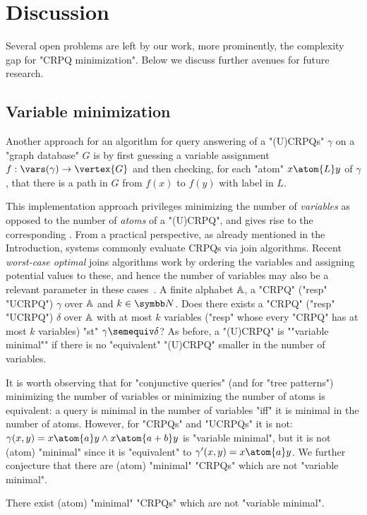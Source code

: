 \section{Discussion}
\AP\label{sec:discussion}

Several open problems are left by our work, more prominently, the complexity gap for "CRPQ minimization". Below we discuss further avenues for future research.

\subsection{Variable minimization}
\AP\label{sec:varmin}

Another approach for an algorithm for query answering of a "(U)CRPQs" $\gamma$ on a "graph database" $G$ is by first guessing a variable assignment $f: \vars(\gamma) \to \vertex{G}$ and then checking, for each "atom" $x \atom{L} y$ of $\gamma$, that there is a path in $G$ from $f(x)$ to $f(y)$ with label in $L$. 

This implementation approach privileges minimizing the number of \emph{variables} as opposed to the number of \emph{atoms} of a "(U)CRPQ", and gives rise to the corresponding . From a practical perspective, as already mentioned in the Introduction, systems commonly evaluate CRPQs via join algorithms. Recent \emph{worst-case optimal} joins algorithms work by ordering the variables and assigning potential values to these, and hence the number of variables may also be a relevant parameter in these cases~\cite{CucumidesReutterVrgoc2024SizeBounds,VrgocEtal2024MillenniumDB}. 
{A finite alphabet $\mathbb{A}$, a  "CRPQ" ("resp" "UCRPQ") $\gamma$ over $\mathbb{A}$ and $k \in \N$.}
{Does there exists a "CRPQ" ("resp" "UCRPQ") $\delta$ over $\mathbb{A}$ with at most $k$ variables 
("resp" whose every "CRPQ" has at most $k$ variables) "st" $\gamma \semequiv \delta$?}
As before, a "(U)CRPQ" is \AP""variable minimal"" if there is no "equivalent" "(U)CRPQ" smaller in the number of variables.

It is worth observing that for "conjunctive queries" (and for "tree patterns") minimizing the number of variables or minimizing the number of atoms is equivalent: a query is minimal in the number of variables "iff" it is minimal in the number of atoms.
However, for "CRPQs" and "UCRPQs" it is not: $\gamma(x,y) = x \atom{a} y \land x \atom{a+b} y$ is "variable minimal", but it is not (atom) "minimal" since it is "equivalent" to $\gamma'(x,y) = x \atom{a} y$. We further conjecture that there are (atom) "minimal" "CRPQs" which are not "variable minimal".
\begin{conjecture}
  There exist (atom) "minimal" "CRPQs" which are not "variable minimal".
\end{conjecture}

